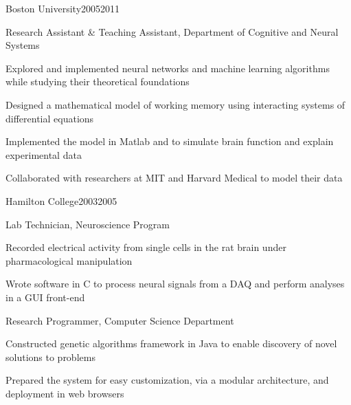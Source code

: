 \documentclass{report}
\begin{document}
  \begin{work_location}{Boston University}{2005}{2011}

    \begin{position}{Research Assistant \& Teaching Assistant, Department of Cognitive and Neural Systems}
      \item Explored and implemented neural networks and machine learning algorithms while studying their theoretical foundations
      \item Designed a mathematical model of working memory using interacting systems of differential equations
      \item Implemented the model in Matlab and \CC{} to simulate brain function and explain experimental data
      \item Collaborated with researchers at MIT and Harvard Medical to model their data
    \end{position}

  \end{work_location}



  \begin{work_location}{Hamilton College}{2003}{2005}

    \begin{position}{Lab Technician, Neuroscience Program}
      \item Recorded electrical activity from single cells in the rat brain under pharmacological manipulation
      \item Wrote software in C to process neural signals from a DAQ and perform analyses in a GUI front-end
    \end{position}

    \begin{position}{Research Programmer, Computer Science Department}
      \item Constructed genetic algorithms framework in Java to enable discovery of novel solutions to problems
      \item Prepared the system for easy customization, via a modular architecture, and deployment in web browsers
    \end{position}

  \end{work_location}






\end{document}
